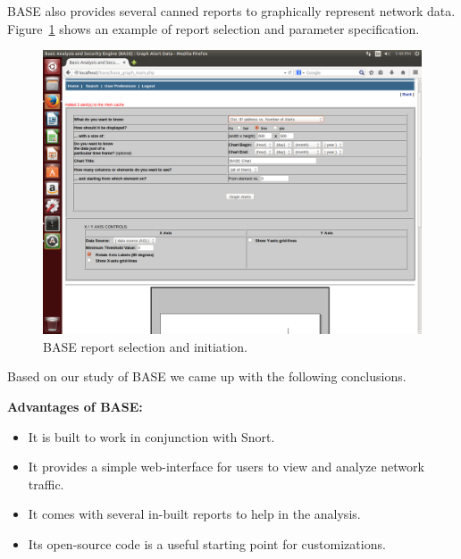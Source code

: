 BASE also provides several canned reports to graphically represent
network data. Figure~\ref{fig:r4} shows an example of report selection and
parameter specification.

\begin{figure}[!tb]
    \centering
    \includegraphics[width=1.7\columnwidth]{figures/R4_BASE_Report}
    \caption{BASE report selection and initiation.}
    \label{fig:r4}
\end{figure}

Based on our study of BASE we came up with the following conclusions.

\textbf{Advantages of BASE:}
\begin{itemize}

\item It is built to work in conjunction with Snort.

\item It provides a simple web-interface for users to view and
  analyze network traffic.

\item It comes with several in-built reports to help in the analysis.

\item Its open-source code is a useful starting point for customizations.

\end{itemize}

